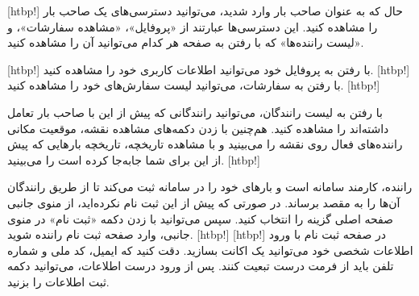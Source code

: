     [htbp!]
         حال که به عنوان صاحب بار وارد شدید، می‌توانید دسترسی‌های یک صاحب بار را مشاهده کنید. این دسترسی‌ها عبارتند از «پروفایل»، «مشاهده سفارشات»، و «لیست راننده‌ها» که با رفتن به صفحه هر کدام می‌توانید آن را مشاهده کنید.

    [htbp!]
\newpage
         با رفتن به پروفایل خود می‌توانید اطلاعات کاربری خود را مشاهده کنید.
    [htbp!]
     با رفتن به سفارشات، می‌توانید لیست سفارش‌های خود را مشاهده کنید.
[htbp!]



     با رفتن به لیست رانندگان، می‌توانید رانندگانی که پیش از این با صاحب بار تعامل داشته‌اند را مشاهده کنید. هم‌چنین با زدن دکمه‌های مشاهده نقشه، موقعیت مکانی راننده‌های فعال روی نقشه را می‌بینید و با مشاهده تاریخچه، تاریخچه بارهایی که پیش از این برای شما جابه‌جا کرده است را می‌بینید.
[htbp!]
\newpage
     
    
         راننده، کارمند سامانه است و بارهای خود را در سامانه ثبت می‌کند تا از طریق رانندگان آن‌ها را به مقصد برساند. در صورتی که پیش از این ثبت نام نکرده‌اید، از منوی جانبی صفحه اصلی گزینه  را انتخاب کنید. سپس می‌توانید با زدن دکمه «ثبت نام» در منوی جانبی، وارد صفحه ثبت نام راننده شوید.
    [htbp!]
[htbp!]
    در صفحه ثبت نام با ورود اطلاعات شخصی خود می‌توانید یک اکانت بسازید. دقت کنید که ایمیل، کد ملی و شماره تلفن باید از فرمت درست تبعیت کنند. پس از ورود درست اطلاعات، می‌توانید دکمه ثبت اطلاعات را بزنید.

